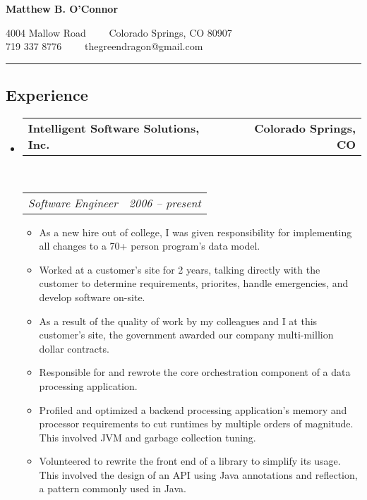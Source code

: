 \documentclass[10pt,letterpaper]{article}
\makeatletter
\newcommand{\headerrow}[2]
{\begin{tabular*}{\linewidth}{l@{\extracolsep{\fill}}r}
	#1 &
	#2 \\
\end{tabular*}}
\makeatother
\begin{document}
\begin{center}
{\LARGE \textbf{Matthew B. O'Connor}}

4004 Mallow Road\ \ \textbullet
\ \ Colorado Springs, CO 80907
\\
719 337 8776\ \ \textbullet
\ \ thegreendragon@gmail.com
\end{center}

\hrule
\vspace{-0.4em}
\subsection*{Experience}

\begin{itemize}
	\parskip=0.1em

	\item
	\headerrow
		{\textbf{Intelligent Software Solutions, Inc.}}
		{\textbf{Colorado Springs, CO}}
	\\
	\headerrow
		{\emph{Software Engineer}}
		{\emph{2006 -- present}}
	\begin{itemize}
		\begin{itemize}
			\item a
			\item b
			\item c
		\end{itemize}
		\begin{description}
			\item[CAOSD] bleh
			\item[SEER] \
				\begin{itemize}
					\item a
					\item b
					\item c
				\end{itemize}
		\end{description}
		\item As a new hire out of college, I was given responsibility for implementing all changes to a 70+ person program's data model.
		\item Worked at a customer's site for 2 \sfrac{1}{2} years, talking directly with the customer to determine requirements, priorites, handle emergencies, and develop software on-site.
		\item As a result of the quality of work by my colleagues and I at this customer's site, the government awarded our company multi-million dollar contracts.
		\item Responsible for and rewrote the core orchestration component of a data processing application.
		\item Profiled and optimized a backend processing application's memory and processor requirements to cut runtimes by multiple orders of magnitude. This involved JVM and garbage collection tuning.
		\item Volunteered to rewrite the front end of a library to simplify its usage. This involved the design of an API using Java annotations and reflection, a pattern commonly used in Java.
	\end{itemize}


\end{itemize}
\end{document}
